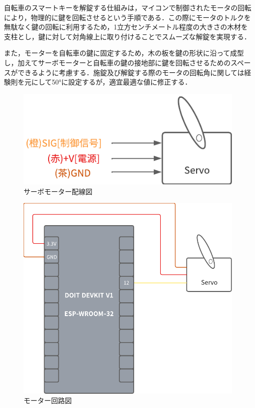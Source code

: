            \par 自転車のスマートキーを解錠する仕組みは，マイコンで制御されたモータの回転により，物理的に鍵を回転させるという手順である．この際にモータのトルクを無駄なく鍵の回転に利用するため，1立方センチメートル程度の大きさの木材を支柱とし，鍵に対して対角線上に取り付けることでスムーズな解錠を実現する．
           \par また，モーターを自転車の鍵に固定するため，木の板を鍵の形状に沿って成型し，加えてサーボモーターと自転車の鍵の接地部に鍵を回転させるためのスペースができるように考慮する．施錠及び解錠する際のモータの回転角に関しては経験則を元にして50°に設定するが，適宜最適な値に修正する．

          \begin{figure}[b]
            \centering
            \includegraphics[scale=1.96]
            {figures/ServoMotorWritingDiagram.png}
            \caption{サーボモーター配線図}
            \label{fig:サーボモーター配線図}
          \end{figure}

          \begin{figure}[b!]
            \centering
            \includegraphics[scale=1.26]
            {figures/MotorCircuitDiagram.png}
            \caption{モーター回路図}
            \label{fig:モーター回路図}
          \end{figure}
      
